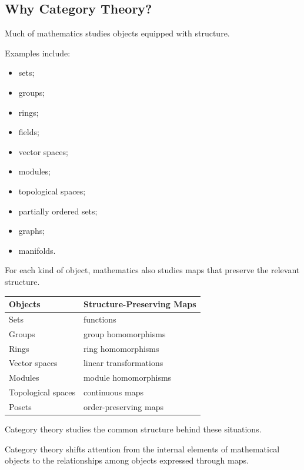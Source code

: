 \subsection{Why Category Theory?}
\label{subsec:why-category-theory}

Much of mathematics studies objects equipped with structure.

Examples include:

\begin{itemize}
    \item sets;
    \item groups;
    \item rings;
    \item fields;
    \item vector spaces;
    \item modules;
    \item topological spaces;
    \item partially ordered sets;
    \item graphs;
    \item manifolds.
\end{itemize}

For each kind of object, mathematics also studies maps that preserve the
relevant structure.

\begin{center}
\begin{tabularx}{0.92\textwidth}{@{}lX@{}}
\toprule
\textbf{Objects} & \textbf{Structure-Preserving Maps}\\
\midrule
Sets & functions\\
Groups & group homomorphisms\\
Rings & ring homomorphisms\\
Vector spaces & linear transformations\\
Modules & module homomorphisms\\
Topological spaces & continuous maps\\
Posets & order-preserving maps\\
\bottomrule
\end{tabularx}
\end{center}

Category theory studies the common structure behind these situations.

\begin{conceptbox}
Category theory shifts attention from the internal elements of mathematical
objects to the relationships among objects expressed through maps.
\end{conceptbox}

